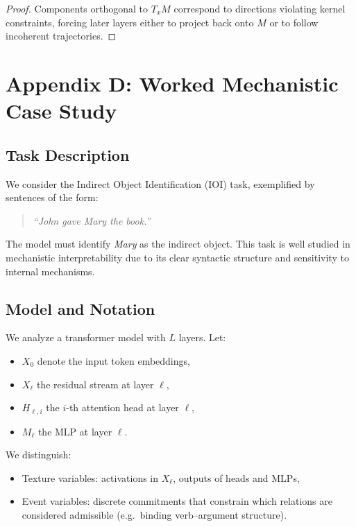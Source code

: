 \documentclass[11pt]{article}
\theoremstyle{remark}
\begin{document}
\begin{proof}
Components orthogonal to $T_x M$ correspond to directions violating
kernel constraints, forcing later layers either to project back onto
$M$ or to follow incoherent trajectories.
\end{proof}

\section{Appendix D: Worked Mechanistic Case Study}

\subsection{Task Description}

We consider the Indirect Object Identification (IOI) task, exemplified
by sentences of the form:
\begin{quote}
\emph{``John gave Mary the book.''}
\end{quote}
The model must identify \emph{Mary} as the indirect object. This task
is well studied in mechanistic interpretability due to its clear
syntactic structure and sensitivity to internal mechanisms.

\subsection{Model and Notation}

We analyze a transformer model with $L$ layers. Let:
\begin{itemize}
\item $X_0$ denote the input token embeddings,
\item $X_\ell$ the residual stream at layer $\ell$,
\item $H_{\ell,i}$ the $i$-th attention head at layer $\ell$,
\item $M_\ell$ the MLP at layer $\ell$.
\end{itemize}

We distinguish:
\begin{itemize}
\item Texture variables: activations in $X_\ell$, outputs of heads and
MLPs,
\item Event variables: discrete commitments that constrain which
relations are considered admissible (e.g.\ binding verb–argument
structure).
\end{itemize}
\end{document}
